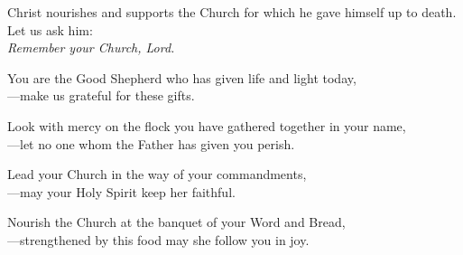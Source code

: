\intercessions

\begin{raggedright}
Christ nourishes and supports the Church for which he gave himself up to death. Let us ask him:\\
\emph{Remember your Church, Lord.}

\medskip
You are the Good Shepherd who has given life and light today,\\
{\color{red}---}make us grateful for these gifts.

\medskip
Look with mercy on the flock you have gathered together in your name,\\
{\color{red}---}let no one whom the Father has given you perish.

\medskip
Lead your Church in the way of your commandments,\\
{\color{red}---}may your Holy Spirit keep her faithful.

\medskip
Nourish the Church at the banquet of your Word and Bread,\\
{\color{red}---}strengthened by this food may she follow you in joy.
\end{raggedright}